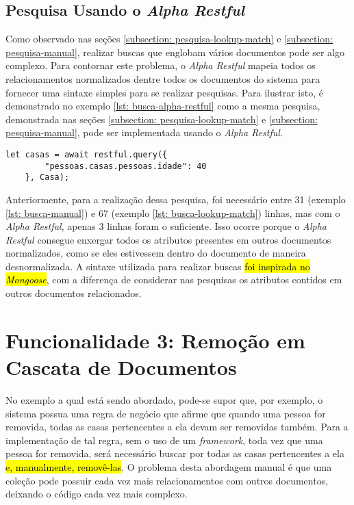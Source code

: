 \subsection{Pesquisa Usando o \textit{Alpha Restful}\label{subsection: pesquisa-usando-alpha-restful}}

Como observado nas seções \ref{subsection: pesquisa-lookup-match} e \ref{subsection: pesquisa-manual}, realizar buscas que englobam vários documentos pode ser algo complexo. Para contornar este problema, o \textit{Alpha Restful} mapeia todos os relacionamentos normalizados dentre todos os documentos do sistema para fornecer uma sintaxe simples para se realizar pesquisas. Para ilustrar isto, é demonstrado no exemplo \ref{lst: busca-alpha-restful} como a mesma pesquisa, demonstrada nas seções \ref{subsection: pesquisa-lookup-match} e \ref{subsection: pesquisa-manual}, pode ser implementada usando o \textit{Alpha Restful}.
    
\begin{lstlisting}[style=ES6, caption={Busca em Dados Normalizados com o \textit{Alpha Restful}\label{lst: busca-alpha-restful}}]
    let casas = await restful.query({
        "pessoas.casas.pessoas.idade": 40
    }, Casa);
\end{lstlisting}
    
Anteriormente, para a realização dessa pesquisa, foi necessário entre 31 (exemplo \ref{lst: busca-manual}) e 67 (exemplo \ref{lst: busca-lookup-match}) linhas, mas com o \textit{Alpha Restful}, apenas 3 linhas foram o suficiente. Isso ocorre porque o \textit{Alpha Restful} consegue enxergar todos os atributos presentes em outros documentos normalizados, como se eles estivessem dentro do documento de maneira desnormalizada. A sintaxe utilizada para realizar buscas \hl{foi inspirada no \textit{Mongoose}}, com a diferença de considerar nas pesquisas os atributos contidos em outros documentos relacionados.

\section{Funcionalidade 3: Remoção em Cascata de Documentos\label{section: remocao-cascata-documentos-relacionados}}
    
No exemplo a qual está sendo abordado, pode-se supor que, por exemplo, o sistema possua uma regra de negócio que afirme que quando uma pessoa for removida, todas as casas pertencentes a ela devam ser removidas também. Para a implementação de tal regra, sem o uso de um \textit{framework}, toda vez que uma pessoa for removida, será necessário buscar por todas as casas pertencentes a ela \hl{e, manualmente, removê-las}. O problema desta abordagem manual é que uma coleção pode possuir cada vez mais relacionamentos com outros documentos, deixando o código cada vez mais complexo.

